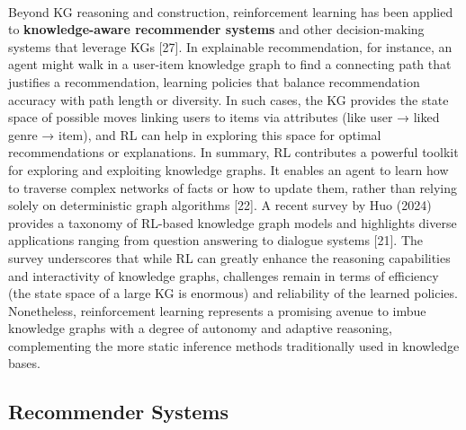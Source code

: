         \paragraph{} Beyond KG reasoning and construction, reinforcement learning has been applied to \textbf{knowledge-aware recommender systems} and other decision-making systems that leverage KGs [27]. In explainable recommendation, for instance, an agent might walk in a user-item knowledge graph to find a connecting path that justifies a recommendation, learning policies that balance recommendation accuracy with path length or diversity. In such cases, the KG provides the state space of possible moves linking users to items via attributes (like user → liked genre → item), and RL can help in exploring this space for optimal recommendations or explanations. In summary, RL contributes a powerful toolkit for exploring and exploiting knowledge graphs. It enables an agent to learn how to traverse complex networks of facts or how to update them, rather than relying solely on deterministic graph algorithms [22]. A recent survey by Huo (2024) provides a taxonomy of RL-based knowledge graph models and highlights diverse applications ranging from question answering to dialogue systems [21]. The survey underscores that while RL can greatly enhance the reasoning capabilities and interactivity of knowledge graphs, challenges remain in terms of efficiency (the state space of a large KG is enormous) and reliability of the learned policies. Nonetheless, reinforcement learning represents a promising avenue to imbue knowledge graphs with a degree of autonomy and adaptive reasoning, complementing the more static inference methods traditionally used in knowledge bases.

    \subsection{Recommender Systems}

